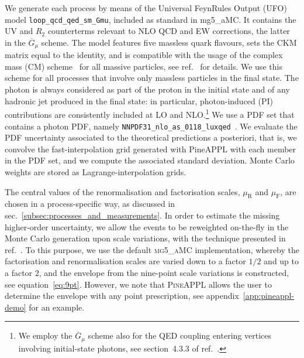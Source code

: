 We generate each process by means of the Universal FeynRules Output
(UFO)~\cite{Degrande:2011ua} model {\tt loop\_qcd\_qed\_sm\_Gmu},
included as standard in {\sc mg5\_aMC}. It contains the UV and $R_2$
counterterms relevant to NLO QCD and EW corrections, the latter in the
$\overline{G}_\mu$ scheme. The model features five massless quark flavours,
sets the CKM matrix equal to the identity, and is compatible with the usage of
the complex mass (CM) scheme~\cite{Denner:1999gp,Denner:2005fg} for all massive particles, see
ref.~\cite{Frederix:2018nkq} for details. We use this scheme
for all processes that involve only massless particles in the final state.
The photon is always considered as part of the proton in the initial state and
of any hadronic jet produced in the final state: 
 in particular, photon-induced (PI) contributions are consistently included at LO and NLO.\footnote{We employ the $\overline{G}_\mu$ scheme also for the QED coupling entering vertices involving initial-state photons, see section~4.3.3 of ref.~\cite{Denner:2019vbn}.}
We use a PDF set that contains a photon PDF, namely
{\tt NNPDF31\_nlo\_as\_0118\_luxqed}~\cite{Bertone:2017bme}. We evaluate the PDF
uncertainty associated to the theoretical predictions a posteriori, that is,
we convolve the fast-interpolation grid generated with {\sc PineAPPL} with
each member in the PDF set, and we compute the associated standard deviation. Monte Carlo
weights are stored as Lagrange-interpolation grids.

The central values of the renormalisation and factorisation scales, $\mu_\mathrm{R}$ and
$\mu_\mathrm{F}$, are chosen in a process-specific way, as discussed in sec.~\ref{subsec:processes_and_measurements}. In order to estimate the missing higher-order uncertainty,
we allow the events to be reweighted on-the-fly in the Monte Carlo generation upon scale
variations, with the technique presented in ref.~\cite{Frederix:2011ss}. To this purpose, we use the default \textsc{mg5\_aMC}
implementation, whereby the factorisation and renormalisation scales
are varied down to a factor $1/2$ and up to a factor $2$, and the envelope
from the nine-point scale variations is constructed,
see equation~\eqref{eq:9pt}. However, we note that
\textsc{PineAPPL} allows the user to determine the envelope with any point
prescription, see appendix~\ref{app:pineappl-demo} for an example.

